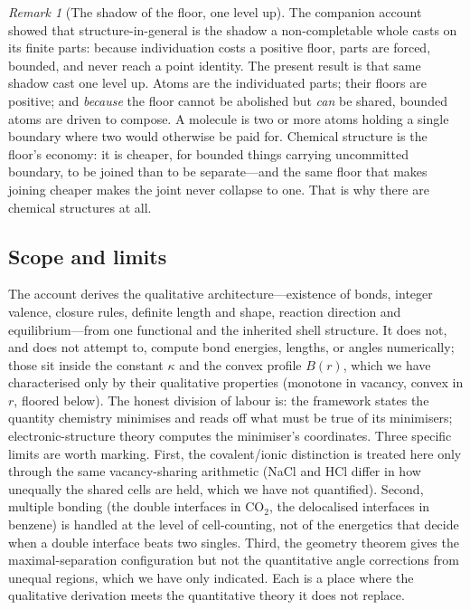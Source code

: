 \documentclass[11pt,a4paper]{article}
\theoremstyle{thmstyle}
\theoremstyle{definition}
\theoremstyle{remark}
\newtheorem{remark}[theorem]{Remark}
\newcommand{\thick}{B}                 %
\begin{document}
\begin{remark}[The shadow of the floor, one level up]
\label{rem:shadow}
The companion account showed that structure-in-general is the shadow a
non-completable whole casts on its finite parts: because individuation
costs a positive floor, parts are forced, bounded, and never reach a point
identity. The present result is that same shadow cast one level up. Atoms
are the individuated parts; their floors are positive; and \emph{because}
the floor cannot be abolished but \emph{can} be shared, bounded atoms are
driven to compose. A molecule is two or more atoms holding a single
boundary where two would otherwise be paid for. Chemical structure is the
floor's economy: it is cheaper, for bounded things carrying uncommitted
boundary, to be joined than to be separate---and the same floor that makes
joining cheaper makes the joint never collapse to one. That is why there
are chemical structures at all.
\end{remark}

\subsection{Scope and limits}

The account derives the qualitative architecture---existence of bonds,
integer valence, closure rules, definite length and shape, reaction
direction and equilibrium---from one functional and the inherited shell
structure. It does not, and does not attempt to, compute bond energies,
lengths, or angles numerically; those sit inside the constant $\kappa$ and
the convex profile $\thick(r)$, which we have characterised only by their
qualitative properties (monotone in vacancy, convex in $r$, floored
below). The honest division of labour is: the framework states the
quantity chemistry minimises and reads off what must be true of its
minimisers; electronic-structure theory computes the minimiser's
coordinates. Three specific limits are worth marking. First, the
covalent/ionic distinction is treated here only through the same
vacancy-sharing arithmetic (NaCl and HCl differ in how unequally the
shared cells are held, which we have not quantified). Second, multiple
bonding (the double interfaces in CO$_2$, the delocalised interfaces in
benzene) is handled at the level of cell-counting, not of the energetics
that decide when a double interface beats two singles. Third, the geometry
theorem gives the maximal-separation configuration but not the
quantitative angle corrections from unequal regions, which we have only
indicated. Each is a place where the qualitative derivation meets the
quantitative theory it does not replace.
\end{document}
